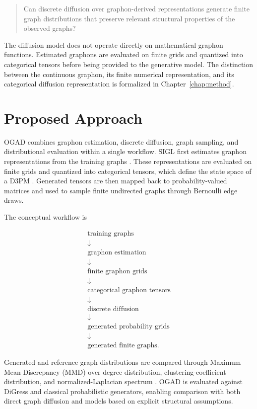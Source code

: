 \begin{quote}
Can discrete diffusion over graphon-derived representations generate finite graph distributions that preserve relevant structural properties of the observed graphs?
\end{quote}

The diffusion model does not operate directly on mathematical graphon functions. Estimated graphons are evaluated on finite grids and quantized into categorical tensors before being provided to the generative model. The distinction between the continuous graphon, its finite numerical representation, and its categorical diffusion representation is formalized in Chapter~\ref{chap:method}.


\section{Proposed Approach}
\label{sec:intro_approach}

OGAD combines graphon estimation, discrete diffusion, graph sampling, and distributional evaluation within a single workflow. SIGL first estimates graphon representations from the training graphs \cite{azizpour2025scalable}. These representations are evaluated on finite grids and quantized into categorical tensors, which define the state space of a D3PM \cite{austin2021structured}. Generated tensors are then mapped back to probability-valued matrices and used to sample finite undirected graphs through Bernoulli edge draws.

The conceptual workflow is

\[
\begin{array}{c}
\text{training graphs} \\
\downarrow \\
\text{graphon estimation} \\
\downarrow \\
\text{finite graphon grids} \\
\downarrow \\
\text{categorical graphon tensors} \\
\downarrow \\
\text{discrete diffusion} \\
\downarrow \\
\text{generated probability grids} \\
\downarrow \\
\text{generated finite graphs}.
\end{array}
\]

Generated and reference graph distributions are compared through Maximum Mean Discrepancy (MMD) over degree distribution, clustering-coefficient distribution, and normalized-Laplacian spectrum \cite{gretton2012kernel}. OGAD is evaluated against DiGress \cite{vignac2023digress} and classical probabilistic generators, enabling comparison with both direct graph diffusion and models based on explicit structural assumptions.


